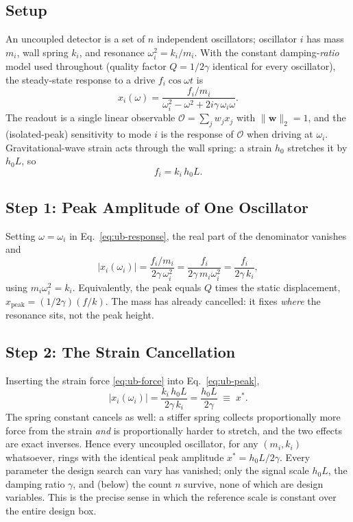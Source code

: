 \documentclass[11pt, letterpaper]{article}
\begin{document}
\subsection{Setup}

An uncoupled detector is a set of $n$ independent oscillators; oscillator
$i$ has mass $m_i$, wall spring $k_i$, and resonance
$\omega_i^2 = k_i/m_i$.  With the constant damping-\emph{ratio} model
used throughout (quality factor $Q = 1/2\gamma$ identical for every
oscillator), the steady-state response to a drive $f_i \cos\omega t$ is
\begin{equation}
  x_i(\omega)
  = \frac{f_i/m_i}{\omega_i^2 - \omega^2 + 2i\gamma\,\omega_i\omega}.
  \label{eq:ub-response}
\end{equation}
The readout is a single linear observable
$\mathcal{O} = \sum_j w_j x_j$ with $\|\mathbf{w}\|_2 = 1$, and the
(isolated-peak) sensitivity to mode $i$ is the response of $\mathcal{O}$
when driving at $\omega_i$.  Gravitational-wave strain acts through the
wall spring: a strain $h_0$ stretches it by $h_0 L$, so
\begin{equation}
  f_i = k_i\, h_0 L.
  \label{eq:ub-force}
\end{equation}

\subsection{Step 1: Peak Amplitude of One Oscillator}

Setting $\omega = \omega_i$ in Eq.~\eqref{eq:ub-response}, the real part
of the denominator vanishes and
\begin{equation}
  |x_i(\omega_i)|
  = \frac{f_i/m_i}{2\gamma\,\omega_i^2}
  = \frac{f_i}{2\gamma\, m_i \omega_i^2}
  = \frac{f_i}{2\gamma\, k_i},
  \label{eq:ub-peak}
\end{equation}
using $m_i\omega_i^2 = k_i$.  Equivalently, the peak equals $Q$ times the
static displacement, $x_{\mathrm{peak}} = (1/2\gamma)(f/k)$.  The mass
has already cancelled: it fixes \emph{where} the resonance sits, not the
peak height.

\subsection{Step 2: The Strain Cancellation}

Inserting the strain force \eqref{eq:ub-force} into
Eq.~\eqref{eq:ub-peak},
\begin{equation}
  |x_i(\omega_i)|
  = \frac{k_i\, h_0 L}{2\gamma\, k_i}
  = \frac{h_0 L}{2\gamma}
  \;\equiv\; x^{*}.
  \label{eq:ub-xstar}
\end{equation}
The spring constant cancels as well: a stiffer spring collects
proportionally more force from the strain \emph{and} is proportionally
harder to stretch, and the two effects are exact inverses.  Hence every
uncoupled oscillator, for any $(m_i, k_i)$ whatsoever, rings with the
identical peak amplitude $x^{*} = h_0 L / 2\gamma$.  Every parameter the
design search can vary has vanished; only the signal scale $h_0 L$, the
damping ratio $\gamma$, and (below) the count $n$ survive, none of which
are design variables.  This is the precise sense in which the reference
scale is constant over the entire design box.
\end{document}
